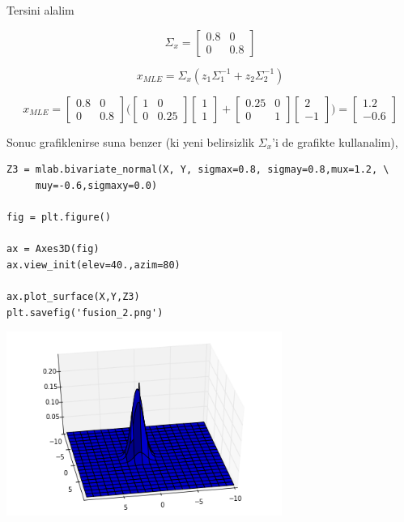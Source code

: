 \documentclass[12pt,fleqn]{article}\usepackage{../common}
\begin{document}
Tersini alalim 

$$ \Sigma_x =
\left[\begin{array}{cc}
0.8 & 0 \\ 0 & 0.8
\end{array}\right] 
$$

$$ x_{MLE} =  \Sigma_x (z_1\Sigma_1^{-1}  + z_2\Sigma_2^{-1}) $$

$$ 
x_{MLE} =
\left[\begin{array}{cc}
0.8 & 0 \\ 0 & 0.8
\end{array}\right] 
\bigg(
\left[\begin{array}{cc}
1 & 0 \\ 0 & 0.25
\end{array}\right] 
\left[\begin{array}{c}
1 \\ 1
\end{array}\right]  + 
\left[\begin{array}{cc}
0.25 & 0 \\ 0 & 1
\end{array}\right] 
\left[\begin{array}{r}
2 \\ -1
\end{array}\right]  
\bigg) = 
\left[\begin{array}{r}
1.2 \\ -0.6
\end{array}\right]  
$$

Sonuc grafiklenirse suna benzer (ki yeni belirsizlik $\Sigma_x$'i de
grafikte kullanalim),

\begin{verbatim}
Z3 = mlab.bivariate_normal(X, Y, sigmax=0.8, sigmay=0.8,mux=1.2, \
     muy=-0.6,sigmaxy=0.0)

fig = plt.figure()

ax = Axes3D(fig)
ax.view_init(elev=40.,azim=80)

ax.plot_surface(X,Y,Z3)
plt.savefig('fusion_2.png')
\end{verbatim}


\includegraphics[height=6cm]{fusion_2.png}
\end{document}
